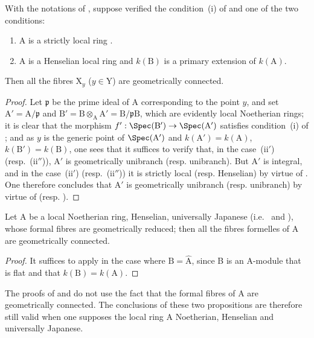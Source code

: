 \begin{corollary}[18.9.8]
\label{IV.18.9.8}
With the notations of , suppose verified the condition~(i) of  and one of the two conditions:
\begin{enumerate}
  \item[\rm(ii$'$)] A is a strictly local ring .
  \item[\rm(ii$''$)] A is a Henselian local ring and $k(\mathrm{B})$ is a primary extension of $k(\mathrm{A})$.
\end{enumerate}
Then all the fibres $\mathrm{X}_y$ ($y\in\mathrm{Y}$) are geometrically connected.
\end{corollary}

\begin{proof}
Let $\mathfrak{p}$ be the prime ideal of A corresponding to the point $y$, and set $\mathrm{A}'=\mathrm{A}/\mathfrak{p}$ and $\mathrm{B}'=\mathrm{B}\otimes_{\mathrm{A}}\mathrm{A}'=\mathrm{B}/\mathfrak{p}\mathrm{B}$, which are evidently local Noetherian rings;
it is clear that the morphism $f':\Spec(\mathrm{B}')\to\Spec(\mathrm{A}')$ satisfies condition~(i) of ;
and as $y$ is the generic point of $\Spec(\mathrm{A}')$ and $k(\mathrm{A}')=k(\mathrm{A})$, $k(\mathrm{B}')=k(\mathrm{B})$, one sees that it suffices to verify that, in the case~(ii$'$) (resp.~(ii$''$)), $\mathrm{A}'$ is geometrically unibranch (resp. unibranch).
But $\mathrm{A}'$ is integral, and in the case~(ii$'$) (resp.~(ii$''$)) it is strictly local (resp. Henselian) by virtue of .
One therefore concludes that $\mathrm{A}'$ is geometrically unibranch (resp. unibranch) by virtue of  (resp. ).
\end{proof}

\begin{corollary}[18.9.9]
\label{IV.18.9.9}
Let $\mathrm{A}$ be a local Noetherian ring, Henselian, universally Japanese (i.e.~ and ), whose formal fibres  are geometrically reduced;
then all the fibres formelles of A are geometrically connected.
\end{corollary}

\begin{proof}
It suffices to apply  in the case where $\mathrm{B}=\hat{\mathrm{A}}$, since B is an A-module that is flat and that $k(\mathrm{B})=k(\mathrm{A})$.
\end{proof}

\begin{remark}[18.9.10]
\label{IV.18.9.10}
The proofs of  and  do not use the fact that the formal fibres of A are geometrically connected.
The conclusions
of these two propositions are therefore still valid when one supposes the local ring A Noetherian, Henselian and universally Japanese.
\end{remark}

